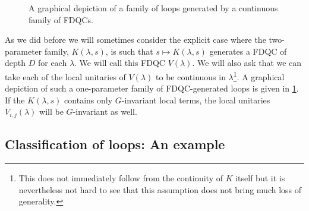 \begin{figure}
	\centering
	
	\caption{A graphical depiction of a family of loops generated by a continuous family of FDQCs.}
	\label{fig:FiniteDepthQuantumCirquitLoop}
\end{figure}
As we did before we will sometimes consider the explicit case where the two-parameter family, $K(\lambda,s)$, is such that $s\mapsto K(\lambda,s)$ generates a FDQC of depth $D$ for each $\lambda$. We will call this FDQC $V(\lambda)$. We will also ask that we can take each of the local unitaries of $V(\lambda)$ to be continuous in $\lambda$\footnote{This does not immediately follow from the continuity of $K$ itself but it is nevertheless not hard to see that this assumption does not bring much loss of generality.}. A graphical depiction of such a one-parameter family of FDQC-generated loops is given in \ref{fig:FiniteDepthQuantumCirquitLoop}. If the $K(\lambda,s)$ contains only $G$-invariant local terms, the local unitaries $V_{i,j}(\lambda)$ will be $G$-invariant as well.
\subsection{Classification of loops: An example}\label{sec:classification-of-loops-an-example}
